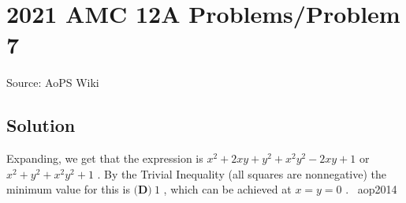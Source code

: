 \documentclass[12pt]{article}
\begin{document}
\section*{{2021 AMC 12A Problems/Problem 7}}
Source: AoPS Wiki

\subsection*{Solution}
Expanding, we get that the expression is $x^2+2xy+y^2+x^2y^2-2xy+1$ or $x^2+y^2+x^2y^2+1$ . By the Trivial Inequality (all squares are nonnegative) the minimum value for this is $\boxed{\textbf{(D)} ~1}$ , which can be achieved at $x=y=0$ . ~aop2014
\end{document}
